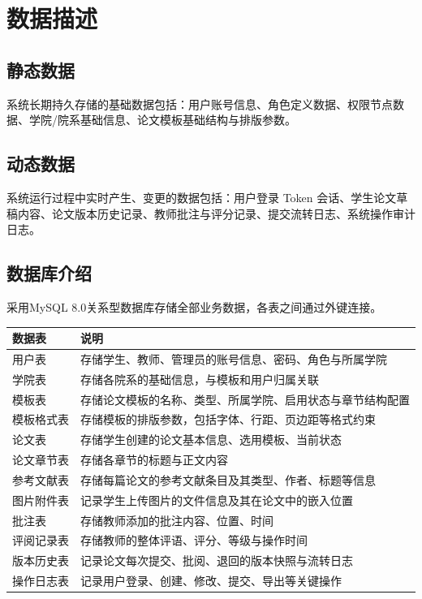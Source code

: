 \documentclass{softeng}
\begin{document}
\section{数据描述}
\subsection{静态数据}
	系统长期持久存储的基础数据包括：用户账号信息、角色定义数据、权限节点数据、学院/院系基础信息、论文模板基础结构与排版参数。
	
\subsection{动态数据}
	系统运行过程中实时产生、变更的数据包括：用户登录 Token 会话、学生论文草稿内容、论文版本历史记录、教师批注与评分记录、提交流转日志、系统操作审计日志。
	
\subsection{数据库介绍}
	采用MySQL 8.0关系型数据库存储全部业务数据，各表之间通过外键连接。

    \begin{tabular}{|p{3.5cm}|p{8cm}|}
    \hline
	\textbf{数据表} &  \textbf{说明} \\
    \hline
    用户表 & 存储学生、教师、管理员的账号信息、密码、角色与所属学院 \\
    \hline
    学院表 & 存储各院系的基础信息，与模板和用户归属关联 \\
    \hline
    模板表 & 存储论文模板的名称、类型、所属学院、启用状态与章节结构配置 \\
    \hline
    模板格式表 & 存储模板的排版参数，包括字体、行距、页边距等格式约束 \\
    \hline
    论文表 & 存储学生创建的论文基本信息、选用模板、当前状态 \\
    \hline
    论文章节表 & 存储各章节的标题与正文内容 \\
    \hline
    参考文献表 & 存储每篇论文的参考文献条目及其类型、作者、标题等信息 \\
    \hline
    图片附件表 & 记录学生上传图片的文件信息及其在论文中的嵌入位置 \\
    \hline
    批注表 & 存储教师添加的批注内容、位置、时间 \\
    \hline
    评阅记录表 & 存储教师的整体评语、评分、等级与操作时间 \\
    \hline
    版本历史表 & 记录论文每次提交、批阅、退回的版本快照与流转日志 \\
    \hline
    操作日志表 & 记录用户登录、创建、修改、提交、导出等关键操作 \\
    \hline
    \end{tabular}
\end{document}
